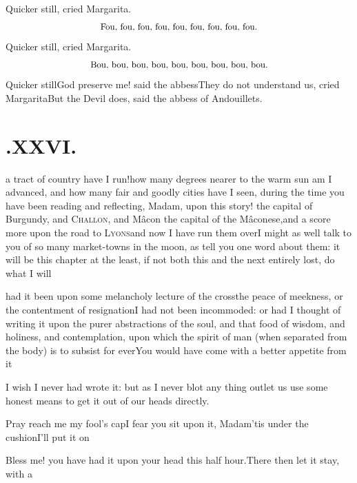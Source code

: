 \documentclass{article}
\begin{document}
Quicker still, cried Margarita.
$$\hbox{\small Fou, fou, fou, fou, fou, fou, fou, fou, fou.}$$
\quad Quicker still, cried Margarita.
$$\hbox{\small Bou, bou, bou, bou, bou, bou, bou, bou, bou.}$$
\quad Quicker still\tsk God preserve me! said the abbess\tsk They do not
understand us, cried Margarita\tsh But the Devil does, said the abbess
of Andouillets.

\vfill{}\eject

\null\smallskip
\section{.\enspace XXVI.}

 a tract of country have I
run!\tsk how many degrees nearer to the warm sun am I advanced,
and how many fair and goodly cities have I seen, during the time
you have been reading and reflecting, Madam, upon this
story!\break
{}
the capital of Burgundy, and
\textsc{Challon}, and Mâcon the capital of the
Mâconese,\break and a score more upon the road to
\textsc{Lyons}\tsh and now I have run them
over\tsh I might as well talk to you of so many market-towns in the moon, as tell
you one word about them: it will be this chapter at the least, if not both this
and the next entirely lost, do what I will\tsh

\noindent
{}

\noindent
{}\break
had it been upon some melancholy lecture of the
cross\tsk the peace of meekness, or the contentment of
resignation\tsh I had not been incommoded: or had I thought of writing
it upon the purer abstractions of the soul, and that food of wisdom,
and holiness, and contemplation, upon which the spirit of man (when
separated from the body) is to subsist for ever\tsh You
would have come with a better appetite from it\tsh

\tsh I wish I never had wrote it: but as I never blot
any thing out\tsh let us use some honest means to get it
out of our heads directly.

\tsh Pray reach me my fool’s cap\tsh I
fear you sit upon it, Madam\tsh ’tis under the
cushion\tsh I’ll put it on\tsh

Bless me! you have had it upon your head this half
hour.\tsh There then let it stay, with a
\end{document}
